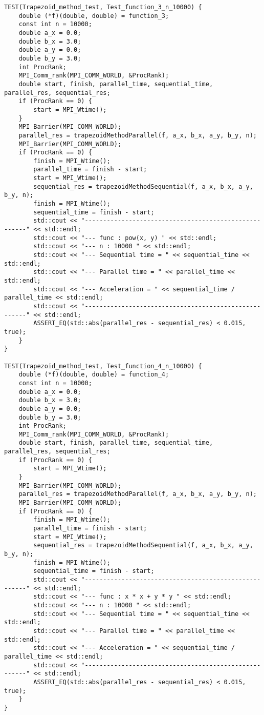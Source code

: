 \documentclass{report}
\begin{document}
\begin{lstlisting}
TEST(Trapezoid_method_test, Test_function_3_n_10000) {
    double (*f)(double, double) = function_3;
    const int n = 10000;
    double a_x = 0.0;
    double b_x = 3.0;
    double a_y = 0.0;
    double b_y = 3.0;
    int ProcRank;
    MPI_Comm_rank(MPI_COMM_WORLD, &ProcRank);
    double start, finish, parallel_time, sequential_time, parallel_res, sequential_res;
    if (ProcRank == 0) {
        start = MPI_Wtime();
    }
    MPI_Barrier(MPI_COMM_WORLD);
    parallel_res = trapezoidMethodParallel(f, a_x, b_x, a_y, b_y, n);
    MPI_Barrier(MPI_COMM_WORLD);
    if (ProcRank == 0) {
        finish = MPI_Wtime();
        parallel_time = finish - start;
        start = MPI_Wtime();
        sequential_res = trapezoidMethodSequential(f, a_x, b_x, a_y, b_y, n);
        finish = MPI_Wtime();
        sequential_time = finish - start;
        std::cout << "------------------------------------------------------" << std::endl;
        std::cout << "--- func : pow(x, y) " << std::endl;
        std::cout << "--- n : 10000 " << std::endl;
        std::cout << "--- Sequential time = " << sequential_time << std::endl;
        std::cout << "--- Parallel time = " << parallel_time << std::endl;
        std::cout << "--- Acceleration = " << sequential_time / parallel_time << std::endl;
        std::cout << "------------------------------------------------------" << std::endl;
        ASSERT_EQ(std::abs(parallel_res - sequential_res) < 0.015, true);
    }
}

TEST(Trapezoid_method_test, Test_function_4_n_10000) {
    double (*f)(double, double) = function_4;
    const int n = 10000;
    double a_x = 0.0;
    double b_x = 3.0;
    double a_y = 0.0;
    double b_y = 3.0;
    int ProcRank;
    MPI_Comm_rank(MPI_COMM_WORLD, &ProcRank);
    double start, finish, parallel_time, sequential_time, parallel_res, sequential_res;
    if (ProcRank == 0) {
        start = MPI_Wtime();
    }
    MPI_Barrier(MPI_COMM_WORLD);
    parallel_res = trapezoidMethodParallel(f, a_x, b_x, a_y, b_y, n);
    MPI_Barrier(MPI_COMM_WORLD);
    if (ProcRank == 0) {
        finish = MPI_Wtime();
        parallel_time = finish - start;
        start = MPI_Wtime();
        sequential_res = trapezoidMethodSequential(f, a_x, b_x, a_y, b_y, n);
        finish = MPI_Wtime();
        sequential_time = finish - start;
        std::cout << "------------------------------------------------------" << std::endl;
        std::cout << "--- func : x * x + y * y " << std::endl;
        std::cout << "--- n : 10000 " << std::endl;
        std::cout << "--- Sequential time = " << sequential_time << std::endl;
        std::cout << "--- Parallel time = " << parallel_time << std::endl;
        std::cout << "--- Acceleration = " << sequential_time / parallel_time << std::endl;
        std::cout << "------------------------------------------------------" << std::endl;
        ASSERT_EQ(std::abs(parallel_res - sequential_res) < 0.015, true);
    }
}


\end{lstlisting}
\end{document}
